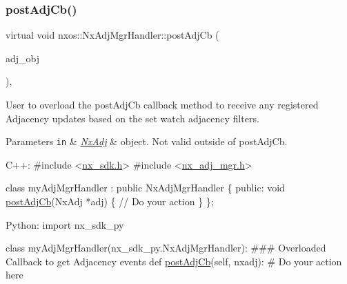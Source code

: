 \subsubsection{\texorpdfstring{post\+Adj\+Cb()}{postAdjCb()}}
{\footnotesize\ttfamily virtual void nxos\+::\+Nx\+Adj\+Mgr\+Handler\+::post\+Adj\+Cb (\begin{DoxyParamCaption}\item[{\mbox{\hyperlink{classnxos_1_1_nx_adj}{Nx\+Adj}} $\ast$}]{adj\+\_\+obj }\end{DoxyParamCaption})\hspace{0.3cm}{\ttfamily [inline]}, {\ttfamily [virtual]}}

User to overload the post\+Adj\+Cb callback method to receive any registered Adjacency updates based on the set watch adjacency filters.


\begin{DoxyParams}[1]{Parameters}
\mbox{\tt in}  & {\em \mbox{\hyperlink{classnxos_1_1_nx_adj}{Nx\+Adj}}} & object. Not valid outside of post\+Adj\+Cb.\\
\hline
\end{DoxyParams}

\begin{DoxyCode}
C++:
\textcolor{preprocessor}{   #include <\mbox{\hyperlink{nx__sdk_8h}{nx\_sdk.h}}>}
\textcolor{preprocessor}{   #include <\mbox{\hyperlink{nx__adj__mgr_8h}{nx\_adj\_mgr.h}}>}

   \textcolor{keyword}{class }myAdjMgrHandler : \textcolor{keyword}{public} NxAdjMgrHandler \{
      \textcolor{keyword}{public}:
         \textcolor{keywordtype}{void} \mbox{\hyperlink{classnxos_1_1_nx_adj_mgr_handler_a9a1f85f218eab71d9c280088f69a14dc}{postAdjCb}}(NxAdj *adj) \{
              \textcolor{comment}{// Do your action}
         \}
   \};

Python:
   \textcolor{keyword}{import} nx\_sdk\_py

   \textcolor{keyword}{class }myAdjMgrHandler(nx\_sdk\_py.NxAdjMgrHandler):
\textcolor{preprocessor}{   ### Overloaded Callback to get Adjacency events}
         def \mbox{\hyperlink{classnxos_1_1_nx_adj_mgr_handler_a9a1f85f218eab71d9c280088f69a14dc}{postAdjCb}}(self, nxadj):
\textcolor{preprocessor}{             # Do your action here}
\end{DoxyCode}
 \mbox{\label{classnxos_1_1_nx_adj_mgr_handler_a84d9b92c976ae528c72e93ab3a75ecd1}} 
